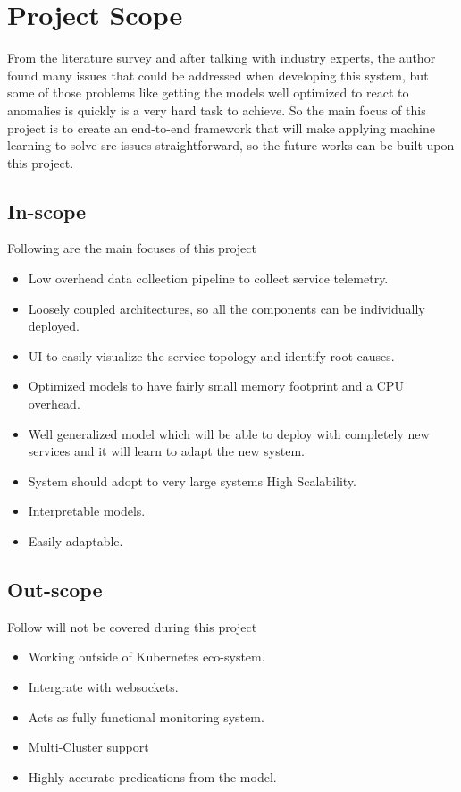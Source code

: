 \section{Project Scope}

From the literature survey and after talking with industry experts, the author found many issues that could be addressed when developing this system, but some of those problems like getting the models well optimized to react to anomalies is quickly is a very hard task to achieve. 
So the main focus of this project is to create an end-to-end framework that will make applying machine learning to solve \ac{sre} issues straightforward, so the future works can be built upon this project.

\subsection{In-scope} \label{sec:in-scope}
Following are the main focuses of this project
\begin{itemize}[noitemsep,nolistsep] 
    \item Low overhead data collection pipeline to collect service telemetry.
    \item Loosely coupled architectures, so all the components can be individually deployed.
    \item UI to easily visualize the service topology and identify root causes.
    \item Optimized models to have fairly small memory footprint and a CPU overhead.
    \item Well generalized model which will be able to deploy with completely new services and it will learn to adapt the new system.
    \item System should adopt to very large systems High Scalability.
    \item Interpretable models.
    \item Easily adaptable.
\end{itemize}


\subsection{Out-scope} \label{sec:out-scope}
Follow will not be covered during this project
\begin{itemize}[noitemsep,nolistsep]
    \item Working outside of Kubernetes eco-system.
    \item Intergrate with websockets.
    \item Acts as fully functional monitoring system.
    \item Multi-Cluster support
    \item Highly accurate predications from the model.
\end{itemize}

